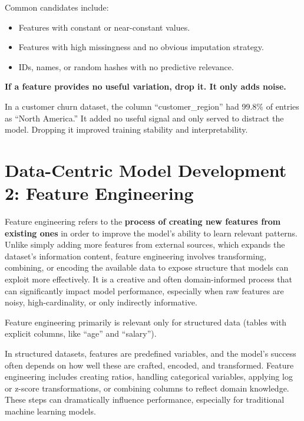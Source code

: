 \documentclass[12pt,openany]{book}
\begin{document}
Common candidates include:
\begin{itemize}
    \item Features with constant or near-constant values.
    \item Features with high missingness and no obvious imputation strategy.
    \item IDs, names, or random hashes with no predictive relevance.
\end{itemize}

\textbf{If a feature provides no useful variation, drop it. It only adds noise.}

\begin{examplebox}
In a customer churn dataset, the column “customer_region” had 99.8\% of entries as “North America.” It added no useful signal and only served to distract the model. Dropping it improved training stability and interpretability.
\end{examplebox}




\chapter{Data-Centric Model Development 2: Feature Engineering}


Feature engineering refers to the \textbf{process of creating new features from existing ones} in order to improve the model’s ability to learn relevant patterns. Unlike simply adding more features from external sources, which expands the dataset’s information content, feature engineering involves transforming, combining, or encoding the available data to expose structure that models can exploit more effectively. It is a creative and often domain-informed process that can significantly impact model performance, especially when raw features are noisy, high-cardinality, or only indirectly informative.
\newline

\begin{notebox}
    Feature engineering primarily is relevant only for structured data (tables with explicit columns, like ``age'' and ``salary'').
\end{notebox}

In structured datasets, features are predefined variables, and the model's success often depends on how well these are crafted, encoded, and transformed. Feature engineering includes creating ratios, handling categorical variables, applying log or z-score transformations, or combining columns to reflect domain knowledge. These steps can dramatically influence performance, especially for traditional machine learning models.
\newline
\end{document}
